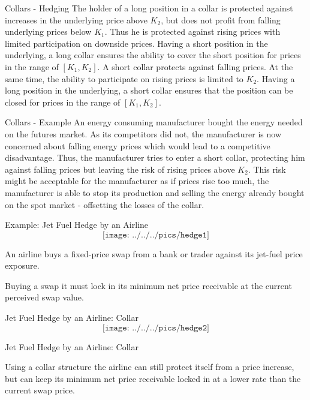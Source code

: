 {Collars - Hedging}
The holder of a long position in a collar is protected against increases in the underlying price above $K_2$, but does not profit from falling underlying prices below $K_1$. Thus he is protected against rising prices with limited participation on downside prices. Having a short position in the underlying, a long collar ensures the ability to cover the short position for prices in the range of $[K_1, K_2]$.
A short collar protects against falling prices. At the same time, the ability to participate on rising prices is limited to $K_2$. Having a long position in the underlying, a short collar ensures that the position can be closed for prices in the range of $[K_1, K_2]$.

{Collars - Example}
An energy consuming manufacturer bought the energy needed on the futures market. As its competitors did not, the manufacturer is now concerned about falling energy prices which would lead to a competitive disadvantage. Thus, the manufacturer tries to enter a short collar, protecting him against falling prices but leaving the risk of rising prices above $K_2$. This risk might be acceptable for the manufacturer as if prices rise too much, the manufacturer is able to stop its production and selling the energy already bought on the spot market - offsetting the losses of the collar.

{Example: Jet Fuel Hedge by an Airline}
\vspace{-0.4cm}
$$\texttt{[image: ../../../pics/hedge1]}$$
\vspace{-0.7cm}






	An airline buys a fixed-price swap from a bank or trader against its jet-fuel price exposure.


	Buying a swap it must lock in its minimum net price receivable at the current perceived swap value.





{Jet Fuel Hedge by an Airline: Collar}
\vspace{-0.4cm}
$$\texttt{[image: ../../../pics/hedge2]}$$

{Jet Fuel Hedge by an Airline: Collar}






	Using a collar structure the airline can still protect itself from a price increase, but can keep its minimum net price receivable locked in at a lower rate than the current swap price.


